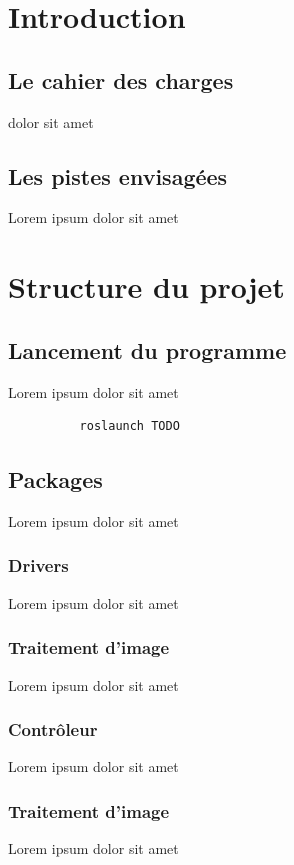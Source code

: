 \documentclass[12pt, openany]{report}
\begin{document}
\tableofcontents

\pagebreak

\section{Introduction}
\subsection{Le cahier des charges}
dolor sit amet
\subsection{Les pistes envisagées}
Lorem ipsum dolor sit amet

\section{Structure du projet}
\subsection{Lancement du programme}
Lorem ipsum dolor sit amet

\begin{lstlisting}
          roslaunch TODO
    \end{lstlisting}

\subsection{Packages}
Lorem ipsum dolor sit amet

\subsubsection{Drivers}
Lorem ipsum dolor sit amet

\subsubsection{Traitement d'image}
Lorem ipsum dolor sit amet

\subsubsection{Contrôleur}
Lorem ipsum dolor sit amet

\subsubsection{Traitement d'image}
Lorem ipsum dolor sit amet
\end{document}
